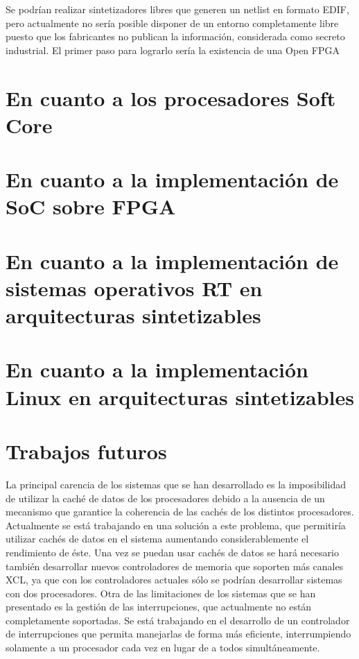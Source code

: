 Se podrían realizar sintetizadores libres que generen un netlist en formato EDIF, pero actualmente no sería posible disponer de un entorno completamente libre puesto que los fabricantes no publican la información, considerada como secreto industrial. El primer paso para lograrlo sería la existencia de una Open FPGA

	\section{En cuanto a los procesadores Soft Core} 
	
	
	
	\section{En cuanto a la implementación de SoC sobre FPGA} 
		
		
	\section{En cuanto a la implementación de sistemas operativos RT en arquitecturas sintetizables} 
		
	
	\section{En cuanto a la implementación Linux en arquitecturas sintetizables} 
		

	\section{Trabajos futuros}

La principal carencia de los sistemas que se han desarrollado es la imposibilidad de utilizar la caché de datos de los procesadores debido a la
ausencia de un mecanismo que garantice la coherencia de las cachés de los distintos procesadores. Actualmente se está trabajando en una solución a
este problema, que permitiría utilizar cachés de datos en el sistema aumentando considerablemente el rendimiento de éste. Una vez se puedan usar
cachés de datos se hará necesario también desarrollar nuevos controladores de memoria que soporten más canales XCL, ya que con los controladores
actuales sólo se podrían desarrollar sistemas con dos procesadores. Otra de las limitaciones de los sistemas que se han presentado es la gestión de
las interrupciones, que actualmente no están completamente soportadas. Se está trabajando en el desarrollo de un controlador de interrupciones que
permita manejarlas de forma más eficiente, interrumpiendo solamente a un procesador cada vez en lugar de a todos simultáneamente.

